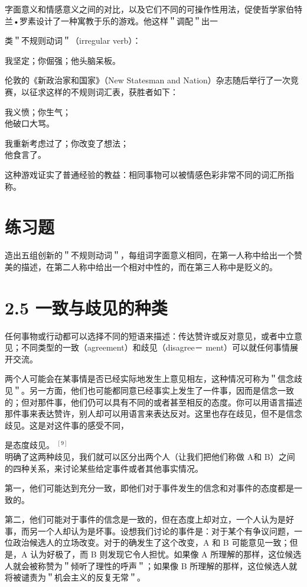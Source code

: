 字面意义和情感意义之间的对比，以及它们不同的可操作性用法，促使哲学家伯特兰•罗素设计了一种寓教于乐的游戏。他这样＂调配＂出一

类＂不规则动词＂（irregular verb）：

我坚定；你倔强；他头脑呆板。

伦敦的《新政治家和国家》（New Statesman and Nation）杂志随后举行了一次竞赛，以征求这样的不规则词汇表，获胜者如下：

我义愤；你生气；\\
他破口大骂。

我重新考虑过了；你改变了想法；\\
他食言了。

这种游戏证实了普通经验的教益：相同事物可以被情感色彩非常不同的词汇所指称。

\section*{练习题}
造出五组创新的＂不规则动词＂，每组词字面意义相同，在第一人称中给出一个赞美的描述，在第二人称中给出一个相对中性的，而在第三人称中是贬义的。

\section*{2.5 一致与歧见的种类}
任何事物或行动都可以选择不同的短语来描述：传达赞许或反对意见，或者中立意见；不同类型的一致（agreement）和歧见（disagree－ ment）可以就任何事情展开交流。

两个人可能会在某事情是否已经实际地发生上意见相左，这种情况可称为＂信念歧见＂。另一方面，他们也可能都同意已经事实上发生了一件事，因而是信念一致的；但对那件事，他们仍可以具有不同的或者甚至相反的态度。你可以用语言描述那件事来表达赞许，别人却可以用语言来表达反对。这里也存在歧见，但不是信念歧见。这是对这件事的感受不同，

是态度歧见。 ${ }^{[9]}$\\
明确了这两种歧见，我们就可以区分出两个人（让我们把他们称做 A和 B）之间的四种关系，来讨论某些给定事件或者其他事实情况。

第一，他们可能达到充分一致，即他们对于事件发生的信念和对事件的态度都是一致的。

第二，他们可能对于事件的信念是一致的，但在态度上却对立，一个人认为是好事，而另一个人却认为是坏事。设想我们讨论的事件是：对于某个有争议问题，一位政治候选人的立场改变。对于的确发生了这个改变，A 和 B 可能意见一致；但是，A 认为好极了，而 B 则发现它令人担忧。如果像 A 所理解的那样，这位候选人就会被称赞为＂倾听了理性的呼声＂；如果像 B 所理解的那样，这位候选人就将被谴责为＂机会主义的反复无常＂。


